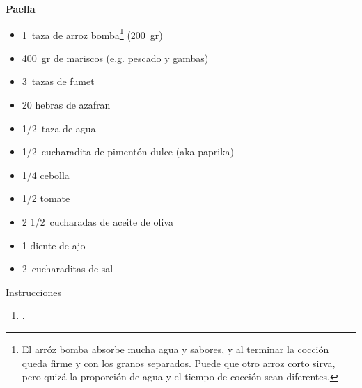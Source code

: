 \textbf{Paella}
\begin{itemize}
\item \SI{1}{taza} de arroz bomba\footnote{El arróz bomba absorbe mucha agua y sabores, y al terminar la cocción queda firme y con los granos separados. Puede que otro arroz corto sirva, pero quizá la proporción de agua y el tiempo de cocción sean diferentes.} (\SI{200}{gr})
\item \SI{400}{gr} de mariscos (e.g. pescado y gambas)
\item \SI{3}{tazas} de fumet
\item 20 hebras de azafran
\item \SI{1/2}{taza} de agua
\item \SI{1/2}{cucharadita} de pimentón dulce (aka paprika)
\item \num{1/4} cebolla
\item \num{1/2} tomate
\item 2 \SI{1/2}{cucharadas} de aceite de oliva
\item 1 diente de ajo
\item \SI{2}{cucharaditas} de sal
\end{itemize}

\underline{Instrucciones}

\begin{enumerate}
\item .
\end{enumerate}

